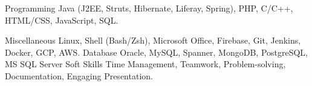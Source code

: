 

\begin{cvskills}

  \cvskill
    {Programming} %
    {Java (J2EE, Struts, Hibernate, Liferay, Spring), PHP, C/C++, HTML/CSS, JavaScript, SQL.} %

  \cvskill
    {Miscellaneous} %
    {Linux, Shell (Bash/Zsh), Microsoft Office, Firebase, Git, Jenkins, Docker, GCP, AWS.} %
  \cvskill
	{Database} %
	{Oracle, MySQL, Spanner, MongoDB, PostgreSQL, MS SQL Server}%
  \cvskill
    {Soft Skills} %
    {Time Management, Teamwork, Problem-solving, Documentation, Engaging Presentation.} %

\end{cvskills}
